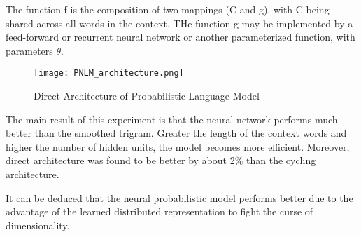 The function f is the composition of two mappings (C and g), with C being shared across all words in the context. THe function g may be implemented by a feed-forward or recurrent neural network or another parameterized function, with parameters $\theta$.

\begin{figure}[H]
    \centering
    \texttt{[image: PNLM\_architecture.png]}
    \caption{Direct Architecture of Probabilistic Language Model}
    \label{fig:Probabilistic Language Model Architecture}
\end{figure}

The main result of this experiment is that the neural network performs much better than the smoothed trigram. Greater the length of the context words and higher the number of hidden units, the model becomes more efficient. Moreover, direct architecture was found to be better by about 2\% than the cycling architecture.

It can be deduced that the neural probabilistic model performs better due to the advantage of the learned distributed representation to fight the curse of dimensionality.